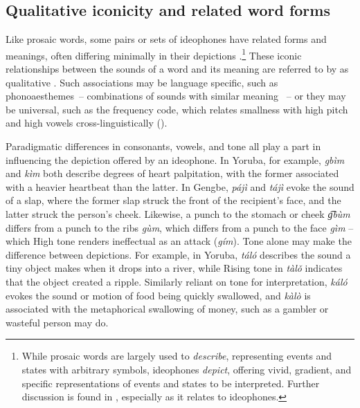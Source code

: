 \documentclass[output=paper,colorlinks,citecolor=brown]{langscibook}
\begin{document}
\subsection{Qualitative iconicity and related word forms}
\begin{sloppypar}
Like prosaic words, some pairs or sets of ideophones have related forms and meanings, often differing minimally in their depictions \citep{Diffloth1972}.\footnote{While prosaic words are largely used to \textit{describe}, representing events and states with arbitrary symbols, ideophones \textit{depict}, offering vivid, gradient, and specific representations of events and states to be interpreted. Further discussion is found in \citet{Dingemanse2015}, especially as it relates to ideophones.} These iconic relationships between the sounds of a word and its meaning are referred to by \citet{CarlingandJohansson2015} as qualitative . Such associations may be language specific, such as phonoaesthemes~-- combinations of sounds with similar meaning \citep{Firth1930}~-- or they may be universal, such as the frequency code, which relates smallness with high pitch and high vowels cross-linguistically (\citealt{Ohala1984, Ohala1994}).
\end{sloppypar}

Paradigmatic differences in consonants, vowels, and tone all play a part in influencing the depiction offered by an ideophone. In Yoruba, for example, \textit{gbìm} and \textit{kìm} both describe degrees of heart palpitation, with the former associated with a heavier heartbeat than the latter. In Gengbe, \textit{pájì} and \textit{tájì} evoke the sound of a slap, where the former slap struck the front of the recipient’s face, and the latter struck the person’s cheek. Likewise, a punch to the stomach or cheek \textit{g͡bùm} differs from a punch to the ribs \textit{gùm}, which differs from a punch to the face \textit{gìm} -- which High tone renders ineffectual as an attack (\textit{gím}). Tone alone may make the difference between depictions. For example, in Yoruba, \textit{táló} describes the sound a tiny object makes when it drops into a river, while Rising tone in \textit{tàlǒ} indicates that the object created a ripple. Similarly reliant on tone for interpretation, \textit{káló} evokes the sound or motion of food being quickly swallowed, and \textit{kàlò} is associated with the metaphorical swallowing of money, such as a gambler or wasteful person may do. 
\end{document}
